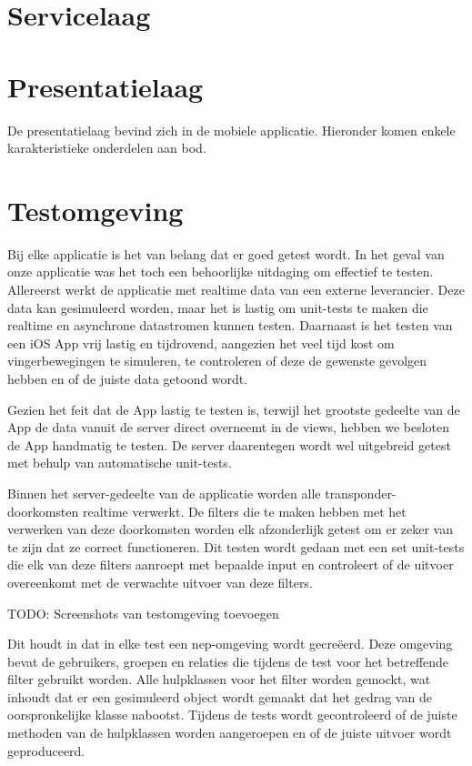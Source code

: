 \section{Servicelaag}
  
  

\section{Presentatielaag}
  De presentatielaag bevind zich in de mobiele applicatie. Hieronder komen enkele karakteristieke onderdelen aan bod.
  

\section{Testomgeving}
Bij elke applicatie is het van belang dat er goed getest wordt. In het geval van onze applicatie was het toch een behoorlijke uitdaging om effectief te testen. Allereerst werkt de applicatie met realtime data van een externe leverancier. Deze data kan gesimuleerd worden, maar het is lastig om unit-tests te maken die realtime en asynchrone datastromen kunnen testen. Daarnaast is het testen van een iOS App vrij lastig en tijdrovend, aangezien het veel tijd kost om vingerbewegingen te simuleren, te controleren of deze de gewenste gevolgen hebben en of de juiste data getoond wordt.

Gezien het feit dat de App lastig te testen is, terwijl het grootste gedeelte van de App de data vanuit de server direct overneemt in de views, hebben we besloten de App handmatig te testen. De server daarentegen wordt wel uitgebreid getest met behulp van automatische unit-tests. 

Binnen het server-gedeelte van de applicatie worden alle transponder-doorkomsten realtime verwerkt. De filters die te maken hebben met het verwerken van deze doorkomsten worden elk afzonderlijk getest om er zeker van te zijn dat ze correct functioneren. Dit testen wordt gedaan met een set unit-tests die elk van deze filters aanroept met bepaalde input en controleert of de uitvoer overeenkomt met de verwachte uitvoer van deze filters.

{\par \bigskip \par \color{red} TODO: Screenshots van testomgeving toevoegen \par \bigskip \par }

Dit houdt in dat in elke test een nep-omgeving wordt gecreëerd. Deze omgeving bevat de gebruikers, groepen en relaties die tijdens de test voor het betreffende filter gebruikt worden. Alle hulpklassen voor het filter worden gemockt, wat inhoudt dat er een gesimuleerd object wordt gemaakt dat het gedrag van de oorspronkelijke klasse nabootst. Tijdens de tests wordt gecontroleerd of de juiste methoden van de hulpklassen worden aangeroepen en of de juiste uitvoer wordt geproduceerd.

